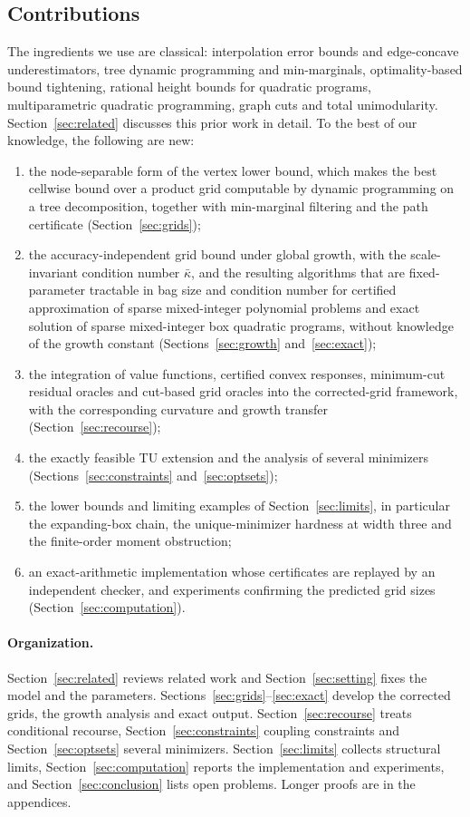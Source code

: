 \subsection{Contributions}
The ingredients we use are classical: interpolation error bounds and
edge-concave underestimators, tree dynamic programming and min-marginals,
optimality-based bound tightening, rational height bounds for quadratic
programs, multiparametric quadratic programming, graph cuts and total
unimodularity. Section~\ref{sec:related} discusses this prior work in detail.
To the best of our knowledge, the following are new:
\begin{enumerate}[label=(\roman*)]
\item the node-separable form of the vertex lower bound, which makes the best
cellwise bound over a product grid computable by dynamic programming on a tree
decomposition, together with min-marginal filtering and the path certificate
(Section~\ref{sec:grids});
\item the accuracy-independent grid bound under global growth, with the
scale-invariant condition number $\bar\kappa$, and the resulting algorithms that
are fixed-parameter tractable in bag size and condition number for certified
approximation of sparse mixed-integer polynomial problems and exact solution
of sparse mixed-integer box quadratic programs, without knowledge of the growth
constant (Sections~\ref{sec:growth} and~\ref{sec:exact});
\item the integration of value functions, certified convex responses,
minimum-cut residual oracles and cut-based grid oracles into the
corrected-grid framework, with the corresponding curvature and growth transfer
(Section~\ref{sec:recourse});
\item the exactly feasible TU extension and the analysis of several
minimizers (Sections~\ref{sec:constraints} and~\ref{sec:optsets});
\item the lower bounds and limiting examples of Section~\ref{sec:limits},
in particular the expanding-box chain, the unique-minimizer hardness at width
three and the finite-order moment obstruction;
\item an exact-arithmetic implementation whose certificates are replayed by an
independent checker, and experiments confirming the predicted grid sizes
(Section~\ref{sec:computation}).
\end{enumerate}

\paragraph{Organization.}
Section~\ref{sec:related} reviews related work and Section~\ref{sec:setting}
fixes the model and the parameters. Sections~\ref{sec:grids}--\ref{sec:exact}
develop the corrected grids, the growth analysis and exact output.
Section~\ref{sec:recourse} treats conditional recourse,
Section~\ref{sec:constraints} coupling constraints and Section~\ref{sec:optsets}
several minimizers. Section~\ref{sec:limits} collects structural limits,
Section~\ref{sec:computation} reports the implementation and experiments, and
Section~\ref{sec:conclusion} lists open problems. Longer proofs are in the
appendices.

